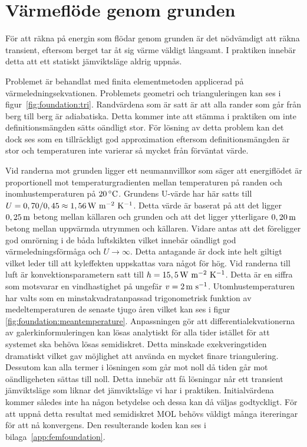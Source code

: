 \section{Värmeflöde genom grunden}

För att räkna på energin som flödar genom grunden är det nödvämdigt att räkna
transient, eftersom berget tar åt sig värme väldigt långsamt. I praktiken innebär detta att ett statiskt jämviktsläge aldrig uppnås.

Problemet är behandlat med finita elementmetoden applicerad på värmeledningsekvationen.
Problemets geometri och trianguleringen kan ses i figur~\ref{fig:foundation:tri}.
Randvärdena som är satt är att alla rander som går från berg till berg är adiabatiska.
Detta kommer inte att stämma i praktiken om inte definitionsmängden sätts oändligt
stor. För lösning av detta problem kan det dock ses som en tillräckligt god
approximation eftersom definitionsmängden är stor och temperaturen inte varierar så mycket
från förväntat värde.

Vid randerna mot grunden ligger ett neumannvillkor som säger att energiflödet är proportionell mot temperaturgradienten mellan temperaturen på randen och inomhustemperaturen på $\unit[20]{^\circ C}$.
Grundens U-värde har här satts till $U = 0,70/0,45 \approx \unit[1,56]{W~m^{-2}~K^{-1}}$. Detta värde är
baserat på att det ligger $\unit[0,25]{m}$ betong mellan källaren och grunden och att det ligger ytterligare $\unit[0,20]{m}$
betong mellan uppvärmda utrymmen och källaren. Vidare antas att det föreligger god omrörning i de båda
luftskikten vilket innebär oändligt god värmeledningsförmåga och $U\rightarrow\infty$. Detta antagande är dock inte helt giltigt vilket leder till att kyleffekten
uppskattas vara något för hög.
Vid randerna till luft är konvektionsparametern satt
till $h = \unit[15,5]{W~m^{-2}~K^{-1}}$. Detta är en siffra som motsvarar
en vindhastighet på ungefär $v = \unit[2]{m~s^{-1}}$. Utomhustemperaturen har valts
som en minstakvadratanpassad trigonometrisk funktion av
medeltemperaturen de senaste tjugo åren vilket kan ses i figur~
\ref{fig:foundation:meantemperature}. Anpassningen gör att
differentialekvationerna av galerkinformuleringen kan lösas analytiskt
för alla tider istället för att systemet ska behöva lösas semidiskret.
Detta minskade exekveringstiden dramatiskt vilket gav möjlighet att använda en
mycket finare triangulering. Dessutom kan alla termer i lösningen
som går mot noll då tiden går mot oändligeheten sättas till noll. Detta innebär
att få lösningar når ett transient jämviktsläge som liknar det jämviktsläge vi har i praktiken.
Initialvärdena kommer således inte ha någon betydelse och dessa kan då väljas
godtyckligt. 
För att uppnå detta resultat med semidiskret MOL behövs väldigt många itereringar för att
nå konvergens. Den resulterande koden kan ses i bilaga~\ref{app:femfoundation}.

